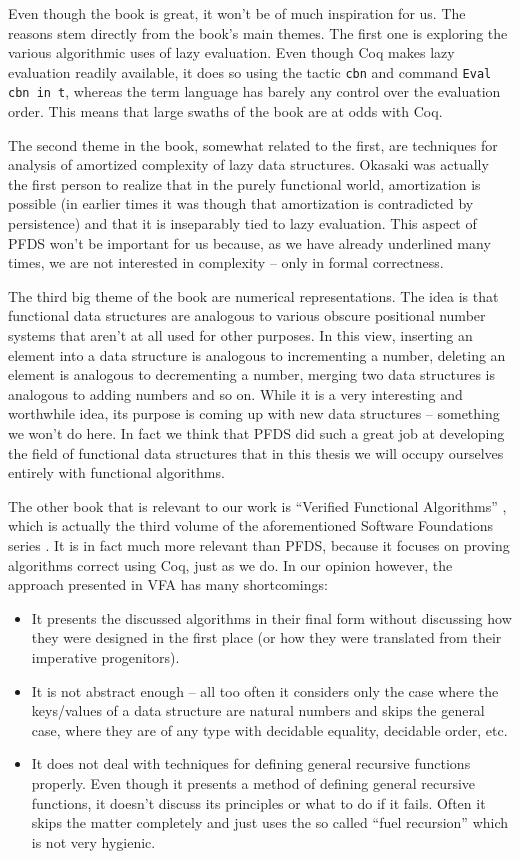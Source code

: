 \documentclass[declaration,mgr,english,shortabstract]{iithesis}
\newcommand{\m}[1]{\texttt{#1}}
\begin{document}
Even though the book is great, it won't be of much inspiration for us. The reasons stem directly from the book's main themes. The first one is exploring the various algorithmic uses of lazy evaluation. Even though Coq makes lazy evaluation readily available, it does so using the tactic \m{cbn} and command \m{Eval cbn in t}, whereas the term language has barely any control over the evaluation order. This means that large swaths of the book are at odds with Coq.

The second theme in the book, somewhat related to the first, are techniques for analysis of amortized complexity of lazy data structures. Okasaki was actually the first person to realize that in the purely functional world, amortization is possible (in earlier times it was though that amortization is contradicted by persistence) and that it is inseparably tied to lazy evaluation. This aspect of PFDS won't be important for us because, as we have already underlined many times, we are not interested in complexity -- only in formal correctness.

The third big theme of the book are numerical representations. The idea is that functional data structures are analogous to various obscure positional number systems that aren't at all used for other purposes. In this view, inserting an element into a data structure is analogous to incrementing a number, deleting an element is analogous to decrementing a number, merging two data structures is analogous to adding numbers and so on. While it is a very interesting and worthwhile idea, its purpose is coming up with new data structures -- something we won't do here. In fact we think that PFDS did such a great job at developing the field of functional data structures that in this thesis we will occupy ourselves entirely with functional algorithms.

The other book that is relevant to our work is ``Verified Functional Algorithms'' \cite{VFA}, which is actually the third volume of the aforementioned Software Foundations series \cite{SoftwareFoundations}. It is in fact much more relevant than PFDS, because it focuses on proving algorithms correct using Coq, just as we do. In our opinion however, the approach presented in VFA has many shortcomings:

\begin{itemize}
    \item It presents the discussed algorithms in their final form without discussing how they were designed in the first place (or how they were translated from their imperative progenitors).
    \item It is not abstract enough -- all too often it considers only the case where the keys/values of a data structure are natural numbers and skips the general case, where they are of any type with decidable equality, decidable order, etc.
    \item It does not deal with techniques for defining general recursive functions properly. Even though it presents a method of defining general recursive functions, it doesn't discuss its principles or what to do if it fails. Often it skips the matter completely and just uses the so called ``fuel recursion'' which is not very hygienic.
\end{itemize}
\end{document}
